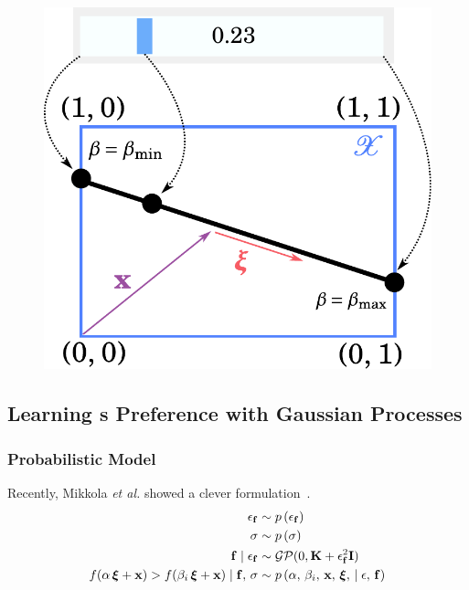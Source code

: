 \begin{figure}[th]
  \centering
  \includegraphics[scale=0.45]{figures/linesearch.pdf}
  \caption{}
\end{figure}

\subsection{Learning {\user}s Preference with Gaussian Processes}\label{section:gp}

\subsubsection{Probabilistic Model}
Recently, Mikkola \textit{et al.} showed a clever formulation~\cite{pmlr-v119-mikkola20a}.
\begin{align*}
\epsilon_{\mathbf{f}}           &\sim p\,(\epsilon_{\mathbf{f}}) \\
\sigma                  &\sim p\,(\sigma) \\
\mathbf{f} \mid \epsilon_{\mathbf{f}}  &\sim \mathcal{GP}(0, \mathbf{K} + \epsilon_{\mathbf{f}}^2\mathbf{I}) \\
  f(\alpha\,\bm{\xi} + \mathbf{x}) > f(\beta_i \,\bm{\xi} + \mathbf{x}) \mid \mathbf{f},\, \sigma
  &\sim p\,(\alpha,\, \beta_i,\, \mathbf{x},\,\bm{\xi},\, \mid \epsilon,\, \mathbf{f})  \\
\end{align*}

